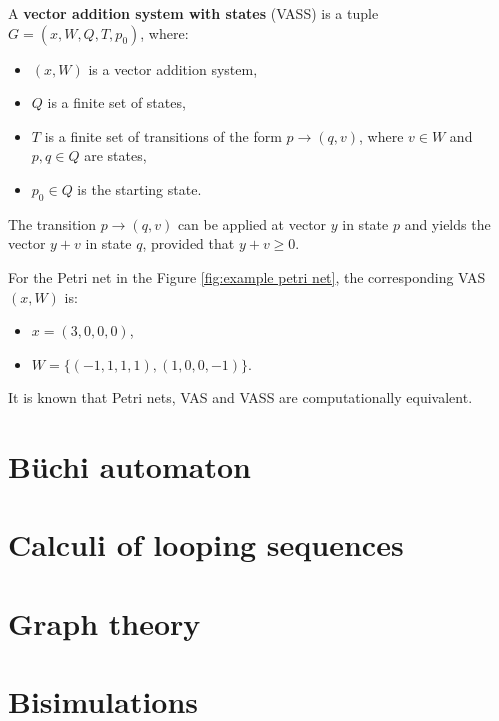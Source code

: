 \begin{definition}
  A {\bf vector addition system with states} (VASS) is a tuple $G = (x, W, Q, T, p_0)$, where:
  \begin{itemize}
    \item $(x, W)$ is a vector addition system,
    \item $Q$ is a finite set of states,
    \item $T$ is a finite set of transitions of the form $p\rightarrow(q,v)$, where $v\in W$ and $p,q\in Q$ are states,
    \item $p_0\in Q$ is the starting state.
  \end{itemize}
\end{definition}

The transition $p\rightarrow(q,v)$ can be applied at vector $y$ in state $p$ and yields the vector $y+v$ in state $q$, provided that $y+v\geq 0$.

\begin{example}
  For the Petri net in the Figure \ref{fig:example petri net}, the corresponding VAS $(x,W)$ is:
  \begin{itemize}
    \item $x=(3,0,0,0)$,
    \item $W=\{(-1,1,1,1),(1,0,0,-1)\}$.
  \end{itemize}
\end{example}

It is known \cite{Hack74PetriVAS} that Petri nets, VAS and VASS are computationally equivalent.


\section{Büchi automaton} %
\label{sec:buchi_automaton}


\section{Calculi of looping sequences} %
\label{sec:calculi_of_looping_sequences}


\section{Graph theory} %
\label{sec:graph_theory}


\section{Bisimulations} %
\label{sec:bisimulations}

